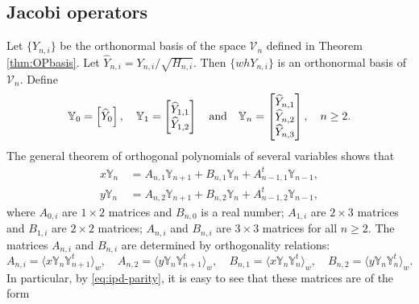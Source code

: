 \documentclass{amsart}
\theoremstyle{remark}
\def\la{{\langle}}
\def\ra{{\rangle}}
\def\la{{\langle}}
\def\ra{{\rangle}}
\def\CV{{\mathcal V}}
\def\YY{{\mathbb Y}}
\newcommand{\wh}{\widehat}
\begin{document}
\subsection{Jacobi operators}
Let $\{Y_{n,i}\}$ be the orthonormal basis of the space $\CV_n$ defined in Theorem \ref{thm:OPbasis}.
Let $\wh Y_{n,i} = Y_{n,i}/\sqrt{H_{n,i}}$. Then $\{wh Y_{n,i}\}$ is an orthonormal basis of $\CV_n$. 
Define 
$$
   \YY_0 =\left[\wh Y_0\right], \quad \YY_1 = \left[ \begin{matrix} \wh Y_{1,1} \\ \wh Y_{1,2}  \end{matrix} \right]
    \quad \hbox{and}\quad \YY_n = \left[ \begin{matrix} \wh Y_{n,1} \\ \wh Y_{n,2} \\ \wh Y_{n,3} \end{matrix} \right], \quad n \ge 2.
$$ 
The general theorem of orthogonal polynomials of several variables shows that
\begin{align}
 x \YY_n &\, = A_{n,1} \YY_{n+1} + B_{n,1} \YY_n + A_{n-1,1}^t \YY_{n-1},  \label{eq:xrec}\\
 y \YY_n &\, = A_{n,2} \YY_{n+1} + B_{n,2} \YY_n + A_{n-1,2}^t \YY_{n-1}, \label{eq:yrec}
\end{align}
where $A_{0,i}$ are $1\times 2$ matrices and $B_{n,0}$ is a real number; $A_{1,i}$ are $2\times 3$ matrices
and $B_{1,i}$ are $2\times 2$ matrices; $A_{n,i}$ and $B_{n,i}$ are $3\times 3$ matrices for all $n \ge 2$.
The matrices $A_{n,i}$ and $B_{n,i}$ are determined by orthogonality relations: 
$$
  A_{n,i} = \la x  \YY_n \YY_{n+1}^t \ra_w, \quad A_{n,2} = \la y  \YY_n \YY_{n+1}^t \ra_w, 
  \quad  B_{n,1} = \la x  \YY_n \YY_{n}^t \ra_w, \quad B_{n,2} = \la y  \YY_n \YY_{n}^t \ra_w.
$$
In particular, by \eqref{eq:ipd-parity}, it is easy to see that these matrices are of the form
\end{document}
